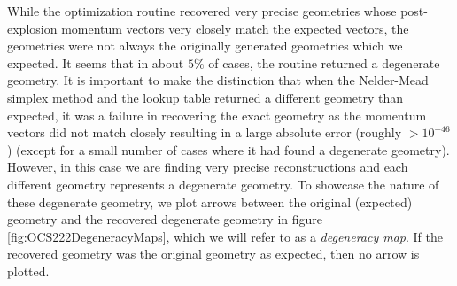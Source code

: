 While the optimization routine recovered very precise geometries whose post-explosion momentum vectors very closely match the expected vectors, the geometries were not always the originally generated geometries which we expected. It seems that in about $5\%$ of cases, the routine returned a degenerate geometry. It is important to make the distinction that when the Nelder-Mead simplex method and the lookup table returned a different geometry than expected, it was a failure in recovering the exact geometry as the momentum vectors did not match closely resulting in a large absolute error (roughly $>10^{-46}$) (except for a small number of cases where it had found a degenerate geometry). However, in this case we are finding very precise reconstructions and each different geometry represents a degenerate geometry. To showcase the nature of these degenerate geometry, we plot arrows between the original (expected) geometry and the recovered degenerate geometry in figure \ref{fig:OCS222DegeneracyMaps}, which we will refer to as a \emph{degeneracy map}. If the recovered geometry was the original geometry as expected, then no arrow is plotted.

